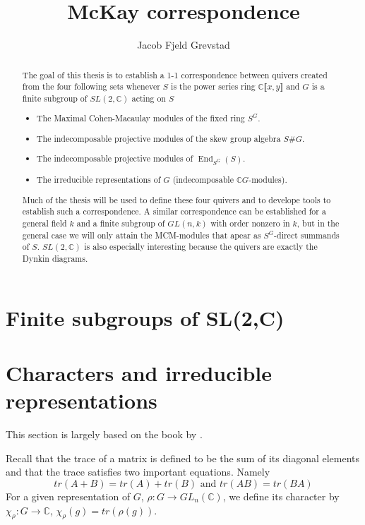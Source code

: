 \documentclass[11pt, a4paper, english]{article}
\numberwithin{prop}{section}
\numberwithin{lemma}{section}
\numberwithin{theorem}{section}
\numberwithin{defin}{section}
\numberwithin{example}{section}
\newcommand{\C}{\mathbb{C}}
\DeclareMathOperator{\End}{End}
\begin{document}
\title{McKay correspondence}
\author{Jacob Fjeld Grevstad}
\maketitle

\begin{abstract}
The goal of this thesis is to establish a 1-1 correspondence between quivers created from the four following sets whenever $S$ is the power series ring $\C \llbracket x, y \rrbracket$ and $G$ is a finite subgroup of $SL(2,\C)$ acting on $S$
\begin{itemize}
\item The Maximal Cohen-Macaulay modules of the fixed ring $S^G$.
\item The indecomposable projective modules of the skew group algebra $S\#G$.
\item The indecomposable projective modules of $\End_{S^G}(S)$.
\item The irreducible representations of $G$ (indecomposable $\C G$-modules).
\end{itemize}
Much of the thesis will be used to define these four quivers and to develope tools to establish such a correspondence. A similar correspondence can be established for a general field $k$ and a finite subgroup of $GL(n, k)$ with order nonzero in $k$, but in the general case we will only attain the MCM-modules that apear as $S^G$-direct summands of $S$. $SL(2, \C)$ is also especially interesting because the quivers are exactly the Dynkin diagrams.
\end{abstract}

\tableofcontents

\iffalse
\section{Finite subgroups of SL(2,C)}

\section{Characters and irreducible representations}
This section is largely based on the book by \cite{RCG}.

Recall that the trace of a matrix is defined to be the sum of its diagonal elements and that the trace satisfies two important equations. Namely
$$tr(A+B)=tr(A)+tr(B) \text{  and  } tr(AB)=tr(BA)$$
For a given representation of $G$, $\rho: G \to GL_n(\mathbb{C})$, we define its character by $\chi_\rho : G \to \mathbb{C}$, $\chi_\rho(g) = tr(\rho(g))$.
\end{document}
